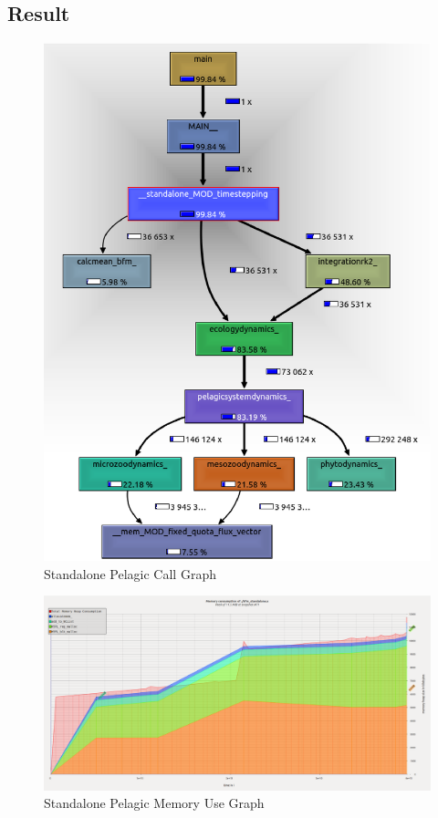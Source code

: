 \subsection{Result}
\begin{figure}
  \centering
  \includegraphics[width=\textwidth]{img/callgrind_std}
  \caption{Standalone Pelagic Call Graph}
  \label{fig:callgrind_std}
\end{figure}

\begin{figure}
  \centering
  \includegraphics[width=\textwidth]{img/massif_std}
  \caption{Standalone Pelagic Memory Use Graph}
  \label{fig:massif_std}
\end{figure}


